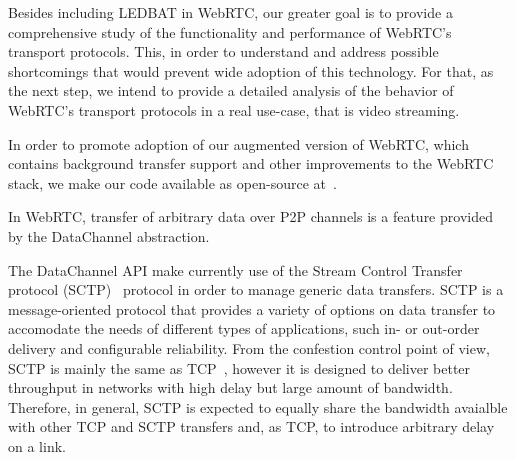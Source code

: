 \documentclass{sig-alternate}
\begin{document}
Besides including LEDBAT in WebRTC, our greater goal is to provide a comprehensive study
of the functionality and performance of WebRTC's transport protocols. This, in order to
understand and address possible shortcomings that would prevent wide adoption of this
technology. For that, as the next step, we intend to provide a detailed analysis of the
behavior of WebRTC's transport protocols in a real use-case, that is video streaming.

In order to promote adoption of our augmented version of WebRTC, which contains background
transfer support and other improvements to the WebRTC stack, we make our code available
as open-source at~\cite{webrtc-utp}.








In WebRTC, transfer of arbitrary data over P2P channels is a feature provided by the
DataChannel abstraction.


The DataChannel API make currently use of the Stream Control Transfer protocol
(SCTP)~\cite{sctp-rfc} protocol in order to manage generic data transfers. SCTP is a
message-oriented protocol that provides a variety of options on data transfer to
accomodate the needs of different types of applications, such in- or out-order delivery
and configurable reliability. 
From the confestion control point of view, SCTP is mainly the same as TCP~\cite{htcp},
however it is designed to deliver better throughput in networks with high delay but large
amount of bandwidth. Therefore, in general, SCTP is expected to equally share the
bandwidth avaialble with other TCP and SCTP transfers and, as TCP, to introduce arbitrary
delay on a link.
\end{document}
